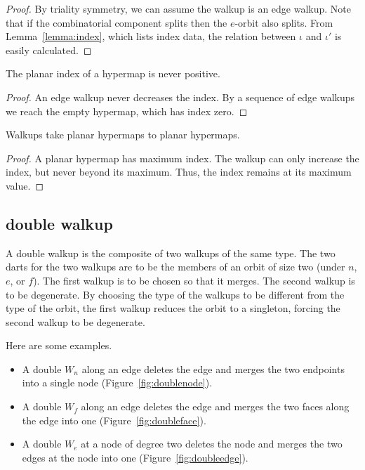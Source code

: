 

\begin{proof}  By triality symmetry, 
we can assume the walkup is an edge walkup.  
Note that
if the combinatorial component splits then
the $e$-orbit also splits.
From Lemma~\ref{lemma:index},
which lists index data, the
relation between $\iota$ and $\iota'$ is easily calculated.
\end{proof}


\begin{lemma}  
The planar index
of a hypermap is never positive.
\end{lemma}

\begin{proof}  An edge walkup never decreases the index.  By a sequence
of edge walkups we reach the empty hypermap, which has
index zero.
\end{proof}


\begin{lemma}
Walkups take planar hypermaps to planar
hypermaps.
\end{lemma}

\begin{proof}  
A planar hypermap has maximum index.  The walkup
can only increase the index, but never beyond its maximum.  
Thus, the index remains at its maximum value.
\end{proof}


\subsection{double walkup}

A double walkup is the composite of two walkups
of the same type.  The
two darts for the two walkups 
are to be the members of an orbit of size
two (under $n$, $e$, or $f$).  The first walkup is to be
chosen so that it merges.  The second walkup is
to be degenerate.
By choosing the type of the walkups to be different from the type of
the orbit, the first walkup reduces the orbit to a singleton,
forcing the second walkup to be degenerate. 
 
Here are some examples.
\begin{itemize}
    \item A double $W_n$ along an edge deletes the edge and 
   merges the two endpoints into
    a single node (Figure~\ref{fig:doublenode}). 
    \item A double $W_f$ along an edge 
    deletes the edge and merges the two faces along the edge into
    one (Figure~\ref{fig:doubleface}).
    \item A double $W_e$ at a node of degree two
    deletes the node and merges the two edges at the node into
    one (Figure~\ref{fig:doubleedge}).
\end{itemize}


